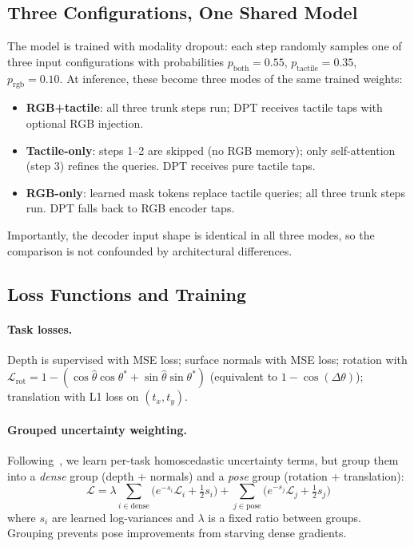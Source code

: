 \subsection{Three Configurations, One Shared Model}
\label{sec:three_configs}

The model is trained with modality dropout: each step randomly samples one of
three input configurations with probabilities
$p_{\text{both}}{=}0.55$, $p_{\text{tactile}}{=}0.35$,
$p_{\text{rgb}}{=}0.10$.
%
At inference, these become three modes of the same trained weights:
\begin{itemize}
\item \textbf{RGB+tactile}: all three trunk steps run; DPT receives tactile
      taps with optional RGB injection.
\item \textbf{Tactile-only}: steps 1--2 are skipped (no RGB memory); only
      self-attention (step 3) refines the queries. DPT receives pure tactile taps.
\item \textbf{RGB-only}: learned mask tokens replace tactile queries; all
      three trunk steps run. DPT falls back to RGB encoder taps.
\end{itemize}
Importantly, the decoder input shape is identical in all three modes, so the
comparison is not confounded by architectural differences.

\subsection{Loss Functions and Training}
\label{sec:losses}

\paragraph{Task losses.}
Depth is supervised with MSE loss; surface normals with MSE loss; rotation
with $\mathcal{L}_{\text{rot}} = 1 - (\cos\hat\theta \cos\theta^*
+ \sin\hat\theta \sin\theta^*)$ (equivalent to $1 - \cos(\Delta\theta)$);
translation with L1 loss on $(t_x, t_y)$.

\paragraph{Grouped uncertainty weighting.}
Following~\cite{kendall2018multi}, we learn per-task homoscedastic uncertainty
terms, but group them into a \emph{dense} group (depth + normals) and a
\emph{pose} group (rotation + translation):
\begin{equation}
  \mathcal{L} = \lambda \sum_{i \in \text{dense}}
    \bigl(e^{-s_i}\mathcal{L}_i + \tfrac{1}{2}s_i\bigr)
  + \sum_{j \in \text{pose}}
    \bigl(e^{-s_j}\mathcal{L}_j + \tfrac{1}{2}s_j\bigr)
\end{equation}
where $s_i$ are learned log-variances and $\lambda$ is a fixed ratio between
groups. Grouping prevents pose improvements from starving dense gradients.

